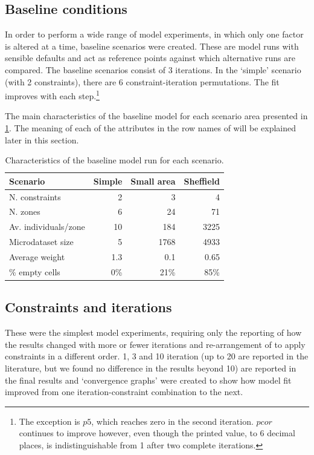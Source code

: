 \documentclass[a4paper,10pt]{article}
\begin{document}
\subsection{Baseline conditions} \label{smbase}
In order to perform a wide range of model experiments, 
in which only one factor is altered at a time, 
baseline scenarios were created. These are model runs with sensible 
defaults and act as reference points against which alternative runs are compared.
The baseline scenarios consist of 3 iterations. In the `simple' scenario (with 2 constraints), 
there are 6 constraint-iteration permutations.
The
fit improves with each step.\footnote{The exception is $p5$,
which reaches zero in the second iteration. $pcor$ continues to improve however, 
even though the printed value, to 6 decimal places, is
indistinguishable from 1 after two complete iterations.}

The main characteristics of the baseline model for each scenario area
presented in \cref{tbase}. The meaning of each of the attributes in the
row names of will be explained later in this section.

\begin{table}[htbp]
\caption{Characteristics of the baseline model run for each scenario.}
\begin{center}
\begin{tabular}{lrrr}
\toprule
Scenario & \multicolumn{1}{l}{Simple} & \multicolumn{1}{l}{Small area} & \multicolumn{1}{l}{Sheffield} \\
\midrule
N. constraints & 2 & 3 & 4 \\
N. zones & 6 & 24 & 71 \\
Av. individuals/zone & 10 & 184 & 3225 \\
Microdataset size & 5 & 1768 & 4933 \\
Average weight & 1.3 & 0.1 & 0.65 \\
\% empty cells & 0\% & 21\% & 85\% \\
\bottomrule
\end{tabular}
\label{tbase}
\end{center}
\end{table}



\subsection{Constraints and iterations}
These were the simplest model experiments, requiring only
the reporting of how the results changed with more or fewer
iterations and re-arrangement of to apply constraints
in a different order. 1, 3 and 10 iteration (up to 20 are
reported in the literature, but we found no difference in the
results beyond 10) are reported in the final
results and `convergence graphs' were created to show how model
fit improved from one iteration-constraint combination to the next.
\end{document}
